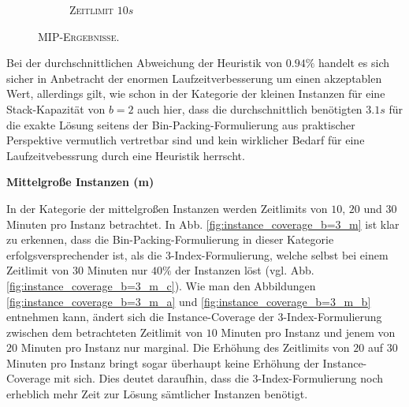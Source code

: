 \begin{figure}[H]
\begin{subfigure}[b]{0.3\textwidth}
\centering
{}
\caption{\textsc{Zeitlimit} $10s$}
\label{fig:mip_results_b=3_s_c}
\end{subfigure}
\caption{\textsc{MIP-Ergebnisse.}}
\label{fig:mip_results_b=3_s}
\end{figure}

Bei der durchschnittlichen Abweichung der Heuristik von $0.94 \%$ handelt es sich sicher in Anbetracht
der enormen Laufzeitverbesserung um einen akzeptablen Wert, allerdings gilt, wie schon in der Kategorie
der kleinen Instanzen für eine Stack-Kapazität von $b = 2$ auch hier, dass die durchschnittlich benötigten $3.1s$
für die exakte Lösung seitens der Bin-Packing-Formulierung aus praktischer Perspektive vermutlich vertretbar sind
und kein wirklicher Bedarf für eine Laufzeitvebessrung durch eine Heuristik herrscht.

\textbf{Mittelgroße Instanzen (m)}

In der Kategorie der mittelgroßen Instanzen werden Zeitlimits von $10$, $20$ und $30$ Minuten pro Instanz betrachtet.
In Abb. \ref{fig:instance_coverage_b=3_m} ist klar zu erkennen, dass die Bin-Packing-Formulierung in dieser Kategorie erfolgsversprechender ist, als die 3-Index-Formulierung, welche selbst bei einem Zeitlimit von $30$ Minuten nur $40 \%$ der Instanzen löst (vgl. Abb. \ref{fig:instance_coverage_b=3_m_c}).
Wie man den Abbildungen \ref{fig:instance_coverage_b=3_m_a} und \ref{fig:instance_coverage_b=3_m_b} entnehmen kann,
ändert sich die Instance-Coverage der 3-Index-Formulierung zwischen dem betrachteten Zeitlimit von $10$ Minuten pro
Instanz und jenem von $20$ Minuten pro Instanz nur marginal.
Die Erhöhung des Zeitlimits von $20$ auf $30$ Minuten pro Instanz bringt sogar überhaupt keine Erhöhung der Instance-Coverage
mit sich. Dies deutet daraufhin, dass die 3-Index-Formulierung noch erheblich mehr Zeit zur Lösung sämtlicher Instanzen benötigt.

